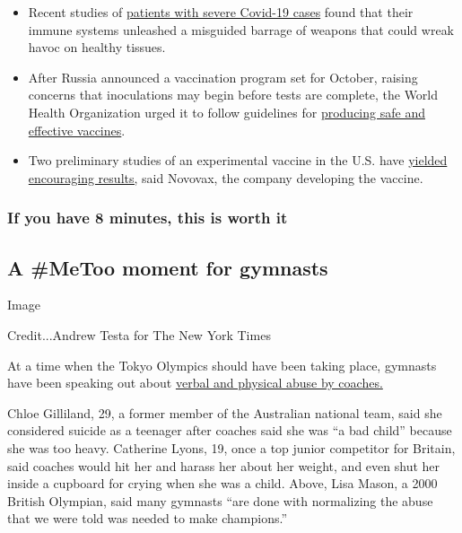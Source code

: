 \begin{itemize}
\item
  Recent studies of
  \href{https://www.nytimes.com/2020/08/04/health/coronavirus-immune-system.html}{patients
  with severe Covid-19 cases} found that their immune systems unleashed
  a misguided barrage of weapons that could wreak havoc on healthy
  tissues.
\item
  After Russia announced a vaccination program set for October, raising
  concerns that inoculations may begin before tests are complete, the
  World Health Organization urged it to follow guidelines for
  \href{https://www.nytimes.com/2020/08/04/world/coronavirus-covid-19.html?action=click\&module=Top\%20Stories\&pgtype=Homepage\#link-7bfa12a5}{producing
  safe and effective vaccines}.
\item
  Two preliminary studies of an experimental vaccine in the U.S. have
  \href{https://www.nytimes.com/2020/08/04/world/coronavirus-cases.html?action=click\&module=Top\%20Stories\&pgtype=Homepage\#link-1228a480}{yielded
  encouraging results,} said Novovax, the company developing the
  vaccine.
\end{itemize}

\hypertarget{if-you-have-8-minutes-this-is-worth-it}{%
\subsubsection{If you have 8 minutes, this is worth
it}\label{if-you-have-8-minutes-this-is-worth-it}}

\hypertarget{a-metoo-moment-for-gymnasts}{%
\subsection{A \#MeToo moment for
gymnasts}\label{a-metoo-moment-for-gymnasts}}

Image

Credit...Andrew Testa for The New York Times

At a time when the Tokyo Olympics should have been taking place,
gymnasts have been speaking out about
\href{https://www.nytimes.com/2020/08/03/sports/olympics/gymnastics-abuse-athlete-a.html}{verbal
and physical abuse by coaches.}

Chloe Gilliland, 29, a former member of the Australian national team,
said she considered suicide as a teenager after coaches said she was ``a
bad child'' because she was too heavy. Catherine Lyons, 19, once a top
junior competitor for Britain, said coaches would hit her and harass her
about her weight, and even shut her inside a cupboard for crying when
she was a child. Above, Lisa Mason, a 2000 British Olympian, said many
gymnasts ``are done with normalizing the abuse that we were told was
needed to make champions.''

